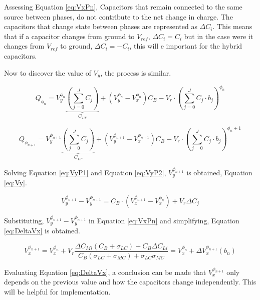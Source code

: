 Assessing Equation \ref{eq:VxPn}, Capacitors that remain connected to the same source between phases, do not contribute to the net change in charge. The capacitors that change state between phases are represented as $\Delta C_i$. This means that if a capacitor changes from ground to $V_{ref}$, $\Delta C_i = C_i$ but in the case were it changes from $V_{ref}$ to ground,  $\Delta C_i = -C_i$, this will e important for the hybrid capacitors.

Now to discover the value of $V_y$, the process is similar. 

\begin{equation}
    Q_{\phi_{n}} = V_y^{\phi_n}\underbrace{\left( \sum_{j=0}^{J}C_j \right)}_{C_{LT}} + (V_y^{\phi_{n}}-V_x^{\phi_{n}})C_B-V_r\cdot \left ( \sum_{j=0}^{J} C_j\cdot b_j \right )^{\phi_n}
    \label{eq:VyP1}
\end{equation}

\begin{equation}
    Q_{\phi_{n+1}} = V_y^{\phi_{n+1}}\underbrace{\left( \sum_{j=0}^{J}C_j \right)}_{C_{LT}} + (V_y^{\phi_{n+1}}-V_x^{\phi_{n+1}})C_B-V_r\cdot \left ( \sum_{j=0}^{J} C_j\cdot b_j \right )^{\phi_n+1}
    \label{eq:VyP2}
\end{equation}

Solving Equation \ref{eq:VyP1} and Equation \ref{eq:VyP2}, $V_{y}^{\phi_{n+1}}$ is obtained, Equation \ref{eq:Vy}.

\begin{equation}
    V_y^{\phi_{n+1}}-V_y^{\phi_{n+1}} = C_B\cdot (V_x^{\phi_{n+1}}-V_x^{\phi_n}) + V_r\Delta C_j
    \label{eq:Vy}
\end{equation}

Substituting, $V_y^{\phi_{n+1}}-V_y^{\phi_{n+1}}$ in Equation \ref{eq:VxPn} and simplifying, Equation \ref{eq:DeltaVx} is obtained.

\begin{equation}
    \boxed{V_{x}^{\phi_{n+1}}=V_{x}^{\phi_n}+V_{r}\frac{   {\Delta}C_{Mi} (C_{B} + \sigma_{LC} )+C_{B} {\Delta}C_{Li}}{C_{B}\left( \sigma_{LC} + \sigma_{MC}\right) + \sigma_{LC} \sigma_{MC}} = V_x^{\phi_n} + \Delta V_x^{\phi_{n+1}} (b_n)}
    \label{eq:DeltaVx}
\end{equation}

Evaluating Equation \ref{eq:DeltaVx}, a conclusion can be made that $V_x^{\phi_{n+1}}$ only depends on the previous value and how the capacitors change independently. This will be helpful for implementation. 